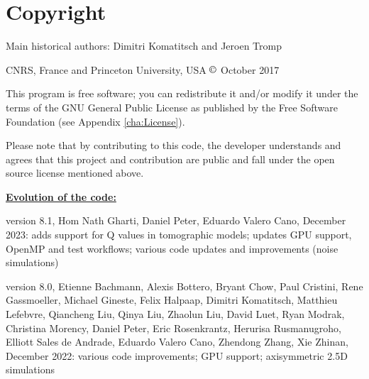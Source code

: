 

\chapter*{Copyright}


Main historical authors: Dimitri Komatitsch and Jeroen Tromp

CNRS, France and Princeton University, USA\newline
$\copyright$ October 2017\newline

\noindent
This program is free software; you can redistribute it and/or modify
it under the terms of the GNU General Public License as published
by the Free Software Foundation (see Appendix \ref{cha:License}).\newline

\noindent
Please note that by contributing to this code, the developer understands and agrees that this project and contribution
are public and fall under the open source license mentioned above.\newline

\noindent
\textbf{\underline{Evolution of the code:}}\newline

version 8.1, Hom Nath Gharti, Daniel Peter, Eduardo Valero Cano, December 2023:\newline
adds support for Q values in tomographic models;
updates GPU support, OpenMP and test workflows;
various code updates and improvements (noise simulations)\newline

version 8.0, Etienne Bachmann, Alexis Bottero, Bryant Chow, Paul Cristini, Rene Gassmoeller, Michael Gineste,
Felix Halpaap, Dimitri Komatitsch, Matthieu Lefebvre, Qiancheng Liu, Qinya Liu, Zhaolun Liu,
David Luet, Ryan Modrak, Christina Morency, Daniel Peter, Eric Rosenkrantz, Herurisa Rusmanugroho,
Elliott Sales de Andrade, Eduardo Valero Cano, Zhendong Zhang, Xie Zhinan, December 2022:\newline
various code improvements;
GPU support;
axisymmetric 2.5D simulations\newline

